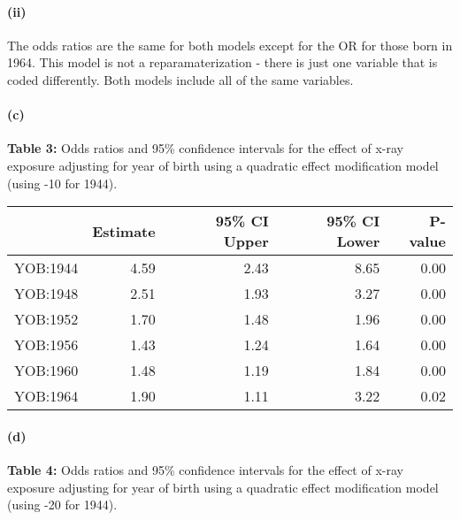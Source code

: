 \documentclass[]{article}
\let\oldparagraph\paragraph
\renewcommand{\paragraph}[1]{\oldparagraph{#1}\mbox{}}
\begin{document}
\paragraph{(ii)}\label{ii}

The odds ratios are the same for both models except for the OR for those
born in 1964. This model is not a reparamaterization - there is just one
variable that is coded differently. Both models include all of the same
variables.

\paragraph{(c)}\label{c}

\textbf{Table 3:} Odds ratios and 95\% confidence intervals for the
effect of x-ray exposure adjusting for year of birth using a quadratic
effect modification model (using -10 for 1944).

\begin{table}[H]
\centering
\begin{tabular}{l|r|r|r|r}
\hline
  & Estimate & 95\% CI Upper & 95\% CI Lower & P-value\\
\hline
YOB:1944 & 4.59 & 2.43 & 8.65 & 0.00\\
\hline
YOB:1948 & 2.51 & 1.93 & 3.27 & 0.00\\
\hline
YOB:1952 & 1.70 & 1.48 & 1.96 & 0.00\\
\hline
YOB:1956 & 1.43 & 1.24 & 1.64 & 0.00\\
\hline
YOB:1960 & 1.48 & 1.19 & 1.84 & 0.00\\
\hline
YOB:1964 & 1.90 & 1.11 & 3.22 & 0.02\\
\hline
\end{tabular}
\end{table}

\paragraph{(d)}\label{d}

\textbf{Table 4:} Odds ratios and 95\% confidence intervals for the
effect of x-ray exposure adjusting for year of birth using a quadratic
effect modification model (using -20 for 1944).
\end{document}
